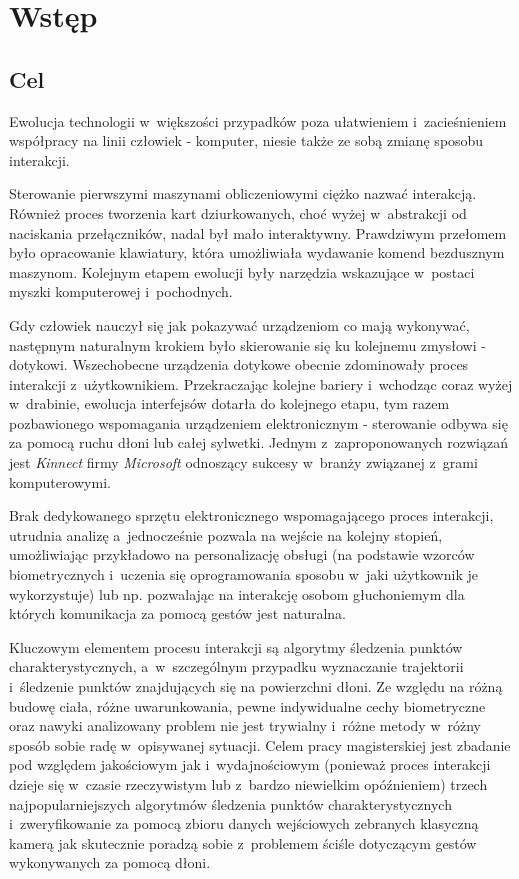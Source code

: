 \chapter{Wstęp}\label{Chapter_Wstep}

  \section{Cel}\label{Section_Aim}
    Ewolucja technologii w~większości przypadków poza ułatwieniem i~zacieśnieniem współpracy na linii człowiek - komputer, niesie także ze sobą zmianę sposobu interakcji.

    Sterowanie pierwszymi maszynami obliczeniowymi ciężko nazwać interakcją. Również proces tworzenia kart dziurkowanych, choć wyżej w~abstrakcji od naciskania przełączników, nadal był mało interaktywny. Prawdziwym przełomem było opracowanie klawiatury, która umożliwiała wydawanie komend bezdusznym maszynom. Kolejnym etapem ewolucji były narzędzia wskazujące w~postaci myszki komputerowej i~pochodnych.

    Gdy człowiek nauczył się jak pokazywać urządzeniom co mają wykonywać, następnym naturalnym krokiem było skierowanie się ku kolejnemu zmysłowi - dotykowi. Wszechobecne urządzenia dotykowe obecnie zdominowały proces interakcji z~użytkownikiem. Przekraczając kolejne bariery i~wchodząc coraz wyżej w~drabinie, ewolucja interfejsów dotarła do kolejnego etapu, tym razem pozbawionego wspomagania urządzeniem elektronicznym - sterowanie odbywa się za pomocą ruchu dłoni lub całej sylwetki. Jednym z~zaproponowanych rozwiązań jest \textit{Kinnect} firmy \textit{Microsoft} odnoszący sukcesy w~branży związanej z~grami komputerowymi.

    Brak dedykowanego sprzętu elektronicznego wspomagającego proces interakcji, utrudnia analizę a~jednocześnie pozwala na wejście na kolejny stopień, umożliwiając przykładowo na personalizację obsługi (na podstawie wzorców biometrycznych i~uczenia się oprogramowania sposobu w~jaki użytkownik je wykorzystuje) lub np. pozwalając na interakcję osobom głuchoniemym dla których komunikacja za pomocą gestów jest naturalna.

    Kluczowym elementem procesu interakcji są algorytmy śledzenia punktów charakterystycznych, a~w~szczególnym przypadku wyznaczanie trajektorii i~śledzenie punktów znajdujących się na powierzchni dłoni. Ze względu na różną budowę ciała, różne uwarunkowania, pewne indywidualne cechy biometryczne oraz nawyki analizowany problem nie jest trywialny i~różne metody w~różny sposób sobie radę w~opisywanej sytuacji. Celem pracy magisterskiej jest zbadanie pod względem jakościowym jak i~wydajnościowym (ponieważ proces interakcji dzieje się w~czasie rzeczywistym lub z~bardzo niewielkim opóźnieniem) trzech najpopularniejszych algorytmów śledzenia punktów charakterystycznych i~zweryfikowanie za pomocą zbioru danych wejściowych zebranych klasyczną kamerą jak skutecznie poradzą sobie z~problemem ściśle dotyczącym gestów wykonywanych za pomocą dłoni.


